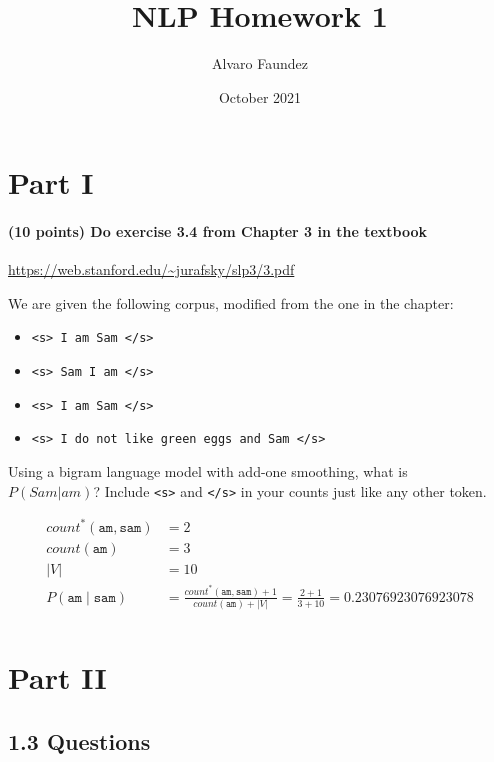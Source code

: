 \documentclass{article}
\title{NLP Homework 1}
\author{Alvaro Faundez}
\date{October 2021}
\begin{document}
\maketitle

\section*{Part I}

\paragraph{(10 points) Do exercise 3.4 from Chapter 3 in the textbook } \url{https://web.stanford.edu/~jurafsky/slp3/3.pdf}

We are given the following corpus, modified from the one in the chapter:

\begin{itemize}
    \item \texttt{<s> I am Sam </s>}
    \item \texttt{<s> Sam I am </s>}
    \item \texttt{<s> I am Sam </s>}
    \item \texttt{<s> I do not like green eggs and Sam </s>}
\end{itemize}

Using a bigram language model with add-one smoothing, what is \\ $P(Sam \vert am)$? Include \texttt{<s>} and \texttt{</s>} in your counts just like any other token.

\begin{equation}
\begin{split}
    count^{*}(\texttt{am} , \texttt{sam}) &= 2 \\
    count(\texttt{am}) &= 3 \\
    |V| &= 10 \\
    P(\texttt{am} \mid \texttt{sam}) &=  \frac{count^{*}(\texttt{am} , \texttt{sam}) + 1}{count(\texttt{am}) + |V|} = \frac{2 + 1}{3 + 10} = 0.23076923076923078  \\
\end{split}
\end{equation}

\section*{Part II}

\subsection*{1.3 Questions}
\end{document}
